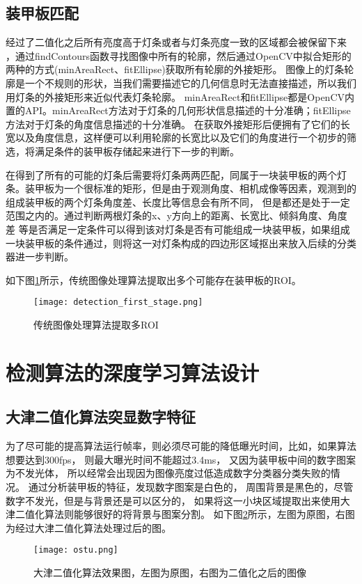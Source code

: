 \subsection{装甲板匹配}

经过了二值化之后所有亮度高于灯条或者与灯条亮度一致的区域都会被保留下来
，通过findContours函数寻找图像中所有的轮廓，然后通过OpenCV中拟合矩形的两种的方式(minAreaRect、fitEllipse)获取所有轮廓的外接矩形。
图像上的灯条轮廓是一个不规则的形状，当我们需要描述它的几何信息时无法直接描述，所以我们用灯条的外接矩形来近似代表灯条轮廓。
minAreaRect和fitEllipse都是OpenCV内置的API。minAreaRect方法对于灯条的几何形状信息描述的十分准确；fitEllipse方法对于灯条的角度信息描述的十分准确。
在获取外接矩形后便拥有了它们的长宽以及角度信息，这样便可以利用轮廓的长宽比以及它们的角度进行一个初步的筛选，将满足条件的装甲板存储起来进行下一步的判断。\par


在得到了所有的可能的灯条后需要将灯条两两匹配，同属于一块装甲板的两个灯条。装甲板为一个很标准的矩形，但是由于观测角度、相机成像等因素，观测到的组成装甲板的两个灯条角度差、长度比等信息会有所不同，
但是都还是处于一定范围之内的。通过判断两根灯条的x、y方向上的距离、长宽比、倾斜角度、角度差
等是否满足一定条件可以得到该对灯条是否有可能组成一块装甲板，如果组成一块装甲板的条件通过，则将这一对灯条构成的四边形区域抠出来放入后续的分类器进一步判断。\par
如下图\ref{传统图像处理算法提取多ROI}所示，传统图像处理算法提取出多个可能存在装甲板的ROI。

\begin{figure}[H]
    \centering
    \texttt{[image: detection\_first\_stage.png]} 
    \caption{传统图像处理算法提取多ROI} 
    \label{传统图像处理算法提取多ROI}
\end{figure}





\section{检测算法的深度学习算法设计}
\subsection{大津二值化算法突显数字特征}
为了尽可能的提高算法运行帧率，则必须尽可能的降低曝光时间，比如，如果算法想要达到300fps，
则最大曝光时间不能超过3.4ms，
又因为装甲板中间的数字图案为不发光体，
所以经常会出现因为图像亮度过低造成数字分类器分类失败的情况。
通过分析装甲板的特征，发现数字图案是白色的，
周围背景是黑色的，尽管数字不发光，但是与背景还是可以区分的，
如果将这一小块区域提取出来使用大津二值化算法\cite{1979A}则能够很好的将背景与图案分割。
如下图\ref{ostu}所示，左图为原图，右图为经过大津二值化算法处理过后的图。
\begin{figure}[H]
    \centering
    \texttt{[image: ostu.png]} 
    \caption{大津二值化算法效果图，左图为原图，右图为二值化之后的图像} 
    \label{ostu}
\end{figure}





